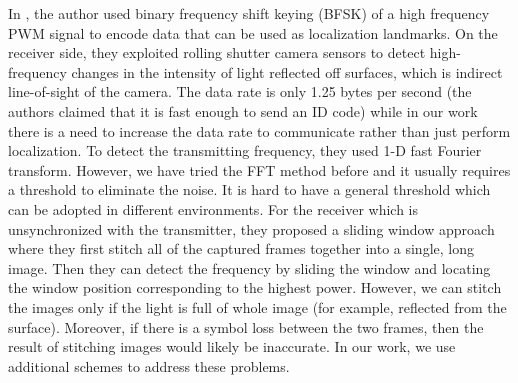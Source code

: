 In \cite{landmark}, the author used binary frequency shift keying (BFSK) of a high frequency PWM signal to encode data that can be used as localization landmarks. On the receiver side, they exploited rolling shutter camera sensors to detect high-frequency changes in the intensity of light reflected off surfaces, which is indirect line-of-sight of the camera. The data rate is only 1.25 bytes per second (the authors claimed that it is fast enough to send an ID code) while in our work there is a need to increase the data rate to communicate rather than just perform localization. To detect the transmitting frequency, they used 1-D fast Fourier transform. However, we have tried the FFT method before and it usually requires a threshold to eliminate the noise. It is hard to have a general threshold which can be adopted in different environments. For the receiver which is unsynchronized with the transmitter, they proposed a sliding window approach where they first stitch all of the captured frames together into a single, long image. Then they can detect the frequency by sliding the window and locating the window position corresponding to the highest power. However, we can stitch the images only if the light is full of whole image (for example, reflected from the surface). Moreover, if there is a symbol loss between the two frames, then the result of stitching images would likely be inaccurate. In our work, we use additional schemes to address these problems.


